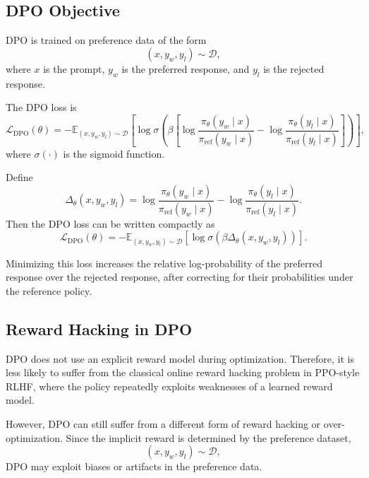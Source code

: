 \subsection{DPO Objective}

DPO is trained on preference data of the form
\[
    (x,y_w,y_l)\sim \mathcal{D},
\]
where $x$ is the prompt, $y_w$ is the preferred response, and $y_l$ is the rejected response.

The DPO loss is
\[
    \mathcal{L}_{\mathrm{DPO}}(\theta)
    =
    -
    \mathbb{E}_{(x,y_w,y_l)\sim\mathcal{D}}
    \left[
        \log \sigma
        \left(
            \beta
            \left[
                \log
                \frac{
                    \pi_\theta(y_w\mid x)
                }{
                    \pi_{\mathrm{ref}}(y_w\mid x)
                }
                -
                \log
                \frac{
                    \pi_\theta(y_l\mid x)
                }{
                    \pi_{\mathrm{ref}}(y_l\mid x)
                }
            \right]
        \right)
    \right],
\]
where $\sigma(\cdot)$ is the sigmoid function.

Define
\[
    \Delta_\theta(x,y_w,y_l)
    =
    \log
    \frac{
        \pi_\theta(y_w\mid x)
    }{
        \pi_{\mathrm{ref}}(y_w\mid x)
    }
    -
    \log
    \frac{
        \pi_\theta(y_l\mid x)
    }{
        \pi_{\mathrm{ref}}(y_l\mid x)
    }.
\]
Then the DPO loss can be written compactly as
\[
    \mathcal{L}_{\mathrm{DPO}}(\theta)
    =
    -
    \mathbb{E}_{(x,y_w,y_l)\sim\mathcal{D}}
    \left[
        \log \sigma
        \left(
            \beta \Delta_\theta(x,y_w,y_l)
        \right)
    \right].
\]

Minimizing this loss increases the relative log-probability of the preferred response over the rejected response, after correcting for their probabilities under the reference policy.

\subsection{Reward Hacking in DPO}

DPO does not use an explicit reward model during optimization. Therefore, it is less likely to suffer from the classical online reward hacking problem in PPO-style RLHF, where the policy repeatedly exploits weaknesses of a learned reward model.

However, DPO can still suffer from a different form of reward hacking or over-optimization. Since the implicit reward is determined by the preference dataset,
\[
    (x,y_w,y_l)\sim \mathcal{D},
\]
DPO may exploit biases or artifacts in the preference data.

